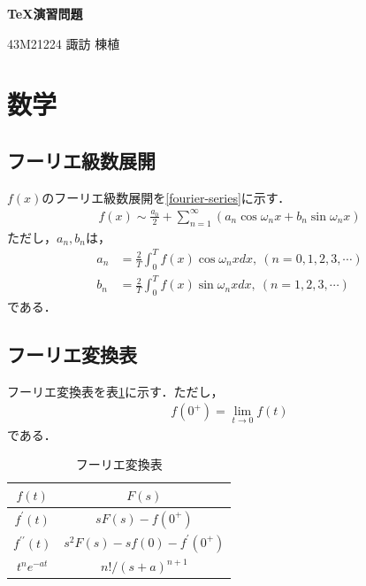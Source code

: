 \documentclass[11pt,a4paper]{jsarticle}
\begin{document}
\begin{center}
  {\Large\bfseries \TeX 演習問題} %
\end{center}
\begin{flushright}
  {\large 43M21224 諏訪 棟植} %
\end{flushright}

\section{数学}

\subsection{フーリエ級数展開}

$f(x)$のフーリエ級数展開を\eqref{fourier-series}に示す．
\begin{align}\label{fourier-series}
  f(x)\sim\frac{a_0}{2}+\sum_{n=1}^\infty\left(a_n\cos \omega_nx+b_n\sin \omega_nx\right)
\end{align}
ただし，$a_n,b_n$は，
\begin{align*}
  a_n & =\frac{2}{T}\int_0^T f(x)\cos\omega_nx dx,~(n=0,1,2,3,\cdots) \\
  b_n & =\frac{2}{T}\int_0^T f(x)\sin\omega_nx dx,~(n=1,2,3,\cdots)
\end{align*}
である．

\subsection{フーリエ変換表}

フーリエ変換表を表\ref{tab:fourier-transform}に示す．ただし，
\begin{align*}
  f(0^+)=\lim_{t\to 0}f(t)
\end{align*}
である．

\begin{table}[hbt]
  \centering
  \caption{フーリエ変換表}
  \label{tab:fourier-transform}
  \begin{tabular}{c|c}
    $f(t)$                & $F(s)$                        \\ \hline
    $f^\prime(t)$         & $sF(s)-f(0^+)$                \\
    $f^{\prime\prime}(t)$ & $s^2F(s)-sf(0)-f^\prime(0^+)$ \\
    $t^ne^{-at}$          & $n!/(s+a)^{n+1}$              \\
  \end{tabular}
\end{table}
\end{document}
